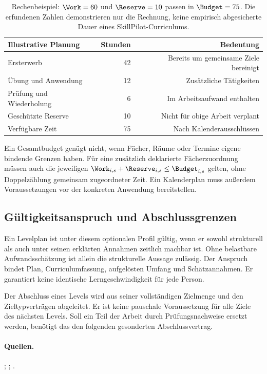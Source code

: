 \begin{table}[htbp]
\centering
\begin{tabular}{@{}lrr@{}}
\toprule
Illustrative Planung & Stunden & Bedeutung\\
\midrule
Ersterwerb & 42 & Bereits um gemeinsame Ziele bereinigt\\
Übung und Anwendung & 12 & Zusätzliche Tätigkeiten\\
Prüfung und Wiederholung & 6 & Im Arbeitsaufwand enthalten\\
Geschützte Reserve & 10 & Nicht für obige Arbeit verplant\\
Verfügbare Zeit & 75 & Nach Kalenderausschlüssen\\
\bottomrule
\end{tabular}
\caption{Rechenbeispiel: $\Work=60$ und $\Reserve=10$ passen in
$\Budget=75$. Die erfundenen Zahlen demonstrieren nur die Rechnung,
keine empirisch abgesicherte Dauer eines SkillPilot-Curriculums.}
\label{tab:workload}
\end{table}

Ein Gesamtbudget genügt nicht, wenn Fächer, Räume oder Termine eigene
bindende Grenzen haben. Für eine zusätzlich deklarierte Fächerzuordnung
müssen auch die jeweiligen $\Work_{i,s}+\Reserve_{i,s}\leq \Budget_{i,s}$
gelten, ohne Doppelzählung gemeinsam zugeordneter Zeit. Ein Kalenderplan
muss außerdem Voraussetzungen vor der konkreten Anwendung bereitstellen.

\subsection{Gültigkeitsanspruch und Abschlussgrenzen}
Ein Levelplan ist unter diesem optionalen Profil gültig, wenn er sowohl
strukturell als auch unter seinen erklärten Annahmen zeitlich machbar ist.
Ohne belastbare Aufwandsschätzung ist allein die strukturelle Aussage
zulässig. Der Anspruch bindet Plan, Curriculumfassung, aufgelösten Umfang
und Schätzannahmen. Er garantiert keine identische Lerngeschwindigkeit
für jede Person.

Der Abschluss eines Levels wird aus seiner vollständigen Zielmenge und den
Zieltypverträgen abgeleitet. Er ist keine pauschale Voraussetzung für alle
Ziele des nächsten Levels. Soll ein Teil der Arbeit durch Prüfungsnachweise
ersetzt werden, benötigt das den folgenden gesonderten Abschlussvertrag.

\paragraph{Quellen.}
;
;
.
